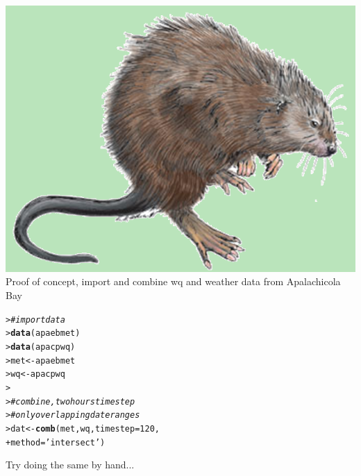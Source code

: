 \documentclass[serif]{beamer}\usepackage[]{graphicx}\usepackage[]{color}
\makeatletter
\newcommand{\hlnum}[1]{\textcolor[rgb]{0.686,0.059,0.569}{#1}}%
\newcommand{\hlstr}[1]{\textcolor[rgb]{0.192,0.494,0.8}{#1}}%
\newcommand{\hlcom}[1]{\textcolor[rgb]{0.678,0.584,0.686}{\textit{#1}}}%
\newcommand{\hlstd}[1]{\textcolor[rgb]{0.345,0.345,0.345}{#1}}%
\newcommand{\hlkwb}[1]{\textcolor[rgb]{0.69,0.353,0.396}{#1}}%
\newcommand{\hlkwc}[1]{\textcolor[rgb]{0.333,0.667,0.333}{#1}}%
\newcommand{\hlkwd}[1]{\textcolor[rgb]{0.737,0.353,0.396}{\textbf{#1}}}%
\newenvironment{kframe}{%
 \def\at@end@of@kframe{}%
 \ifinner\ifhmode%
  \def\at@end@of@kframe{\end{minipage}}%
  \begin{minipage}{\columnwidth}%
 \fi\fi%
 \def\FrameCommand##1{\hskip\@totalleftmargin \hskip-\fboxsep
 \colorbox{shadecolor}{##1}\hskip-\fboxsep
     \hskip-\linewidth \hskip-\@totalleftmargin \hskip\columnwidth}%
 \MakeFramed {\advance\hsize-\width
   \@totalleftmargin\z@ \linewidth\hsize
   \@setminipage}}%
 {\par\unskip\endMakeFramed%
 \at@end@of@kframe}
\newenvironment{knitrout}{}{} %
\makeatother
\begin{document}
\begin{frame}[fragile]{\includegraphics[width=0.05\paperwidth]{fig/muskrat.png}\hspace{0.07in}{\bf SWMPrats.net: The SWMPr package}}
Proof of concept, import and combine wq and weather data from Apalachicola Bay
\begin{knitrout}
\color{fgcolor}\begin{kframe}
\begin{alltt}
\hlstd{> }\hlcom{# import data}
\hlstd{> }\hlkwd{data}\hlstd{(apaebmet)}
\hlstd{> }\hlkwd{data}\hlstd{(apacpwq)}
\hlstd{> }\hlstd{met} \hlkwb{<-} \hlstd{apaebmet}
\hlstd{> }\hlstd{wq} \hlkwb{<-} \hlstd{apacpwq}
\hlstd{> }
\hlstd{> }\hlcom{# combine, two hours time step}
\hlstd{> }\hlcom{# only overlapping date ranges}
\hlstd{> }\hlstd{dat} \hlkwb{<-} \hlkwd{comb}\hlstd{(met, wq,} \hlkwc{timestep} \hlstd{=} \hlnum{120}\hlstd{,}
\hlstd{+ }  \hlkwc{method} \hlstd{=} \hlstr{'intersect'}\hlstd{)}
\end{alltt}
\end{kframe}
\end{knitrout}
Try doing the same by hand...
\end{frame}
\end{document}
